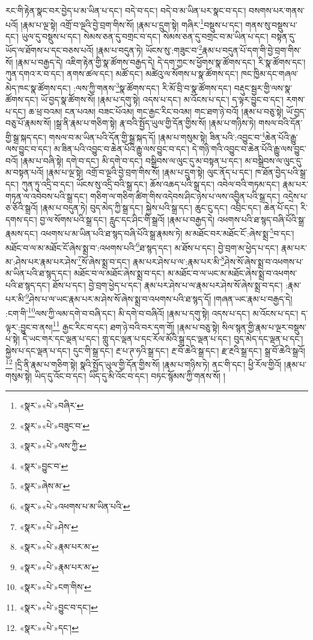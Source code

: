 རང་གི་རྟེན་སྣང་བར་བྱེད་པ་མ་ཡིན་པ་དང་། བདེ་བ་དང་། བདེ་བ་མ་ཡིན་པར་སྣང་བ་དང་། བསགས་པར་གནས་པའོ། །རྣམ་པ་ལྔ་སྟེ། འགྲོ་བ་ལྔའི་བྱེ་བྲག་གིས་སོ། །རྣམ་པ་དྲུག་སྟེ། གཞིར་\footnote{«སྣར་»«པེ་»བཞིར་}བསྡུས་པ་དང་། གནས་སུ་བསྡུས་པ་དང་། ཡུལ་དུ་བསྡུས་པ་དང་། སེམས་ཅན་དུ་བགྲང་བ་དང་། སེམས་ཅན་དུ་བགྲང་བ་མ་ཡིན་པ་དང་། བསྟན་དུ་ཡོད་ལ་ཐོགས་པ་དང་བཅས་པའོ། །རྣམ་པ་བདུན་ཏེ། ཡོངས་སུ་:གཟུང་བ་\footnote{«སྣར་»«པེ་»བཟུང་བ་}རྣམ་པ་བདུན་པོ་དག་གི་བྱེ་བྲག་གིས་སོ། །རྣམ་པ་བརྒྱད་དེ། འཇིག་རྟེན་གྱི་སྣ་ཚོགས་བརྒྱད་དེ། དེ་དག་ཀྱང་ས་ཕྱོགས་སྣ་ཚོགས་དང་། རི་སྣ་ཚོགས་དང་། ཀུན་དགའ་ར་བ་དང་། ནགས་ཚལ་དང་། མཚོ་དང་། མཚེའུ་ལ་སོགས་པ་སྣ་ཚོགས་དང་། ཁང་ཁྱིམ་དང་གཞལ་མེད་ཁང་སྣ་ཚོགས་དང་། :ལས་ཀྱི་གནས་\footnote{«སྣར་»«པེ་»ལས་ཀྱི་}སྣ་ཚོགས་དང་། རི་མོ་བྲི་བ་སྣ་ཚོགས་དང་། བརྡུང་སྦྱར་གྱི་ལས་སྣ་ཚོགས་དང་། ཡོ་བྱད་སྣ་ཚོགས་སོ། །རྣམ་པ་དགུ་སྟེ། འདས་པ་དང་། མ་འོངས་པ་དང་། ད་ལྟར་བྱུང་བ་དང་། རགས་པ་དང་། ཆ་ཕྲ་བའམ། ངན་པའམ། བཟང་པོའམ། གང་རྒྱང་རིང་བའམ། གང་ཐག་ཉེ་བའོ། །རྣམ་པ་བཅུ་སྟེ། ཡོ་བྱད་བཅུ་པོ་རྣམས་སོ། །སྒྲ་ནི་རྣམ་པ་གཅིག་སྟེ། རྣ་བའི་སྤྱོད་ཡུལ་གྱི་དོན་གྱིས་སོ། །རྣམ་པ་གཉིས་ཏེ། གསལ་བའི་དོན་གྱི་སྒྲ་སྐད་དང་། གསལ་བ་མ་ཡིན་པའི་དོན་གྱི་སྒྲ་སྐད་དོ། །རྣམ་པ་གསུམ་སྟེ། ཟིན་པའི་:འབྱུང་བ་\footnote{«སྣར་»བྱུང་བ་}ཆེན་པོའི་རྒྱུ་ལས་བྱུང་བ་དང་། མ་ཟིན་པའི་འབྱུང་བ་ཆེན་པོའི་རྒྱུ་ལས་བྱུང་བ་དང་། དེ་གཉི་གའི་འབྱུང་བ་ཆེན་པོའི་རྒྱུ་ལས་བྱུང་བའོ། །རྣམ་པ་བཞི་སྟེ། དགེ་བ་དང་། མི་དགེ་བ་དང་། བསྒྲིབས་ལ་ལུང་དུ་མ་བསྟན་པ་དང་། མ་བསྒྲིབས་ལ་ལུང་དུ་མ་བསྟན་པའོ། །རྣམ་པ་ལྔ་སྟེ། འགྲོ་བ་ལྔའི་བྱེ་བྲག་གིས་སོ། །རྣམ་པ་དྲུག་སྟེ། ལུང་ནོད་པ་དང་། ཁ་ཐོན་བྱེད་པའི་སྒྲ་དང་། ཀུན་ཏུ་འདྲི་བ་དང་། ཡོངས་སུ་འདྲི་བའི་སྒྲ་དང་། ཆོས་འཆད་པའི་སྒྲ་དང་། འབེལ་བའི་གཏམ་དང་། རྣམ་པར་གཏན་ལ་འབེབས་པའི་སྒྲ་དང་། གཅིག་ལ་གཅིག་ཚིག་གིས་འདེབས་ཤིང་ཉེས་པ་ལས་འབྱིན་པའི་སྒྲ་དང་། འདྲེས་པ་ཅ་ཅོའི་སྒྲའོ། །རྣམ་པ་བདུན་ཏེ། བུད་མེད་ཀྱི་སྒྲ་དང་། སྐྱེས་པའི་སྒྲ་དང་། ཆུང་ངུ་དང་། འབྲིང་དང་། ཆེན་པོ་དང་། རི་དགས་དང་། བྱ་ལ་སོགས་པའི་སྒྲ་དང་། རླུང་དང་ཤིང་གི་སྒྲའོ། །རྣམ་པ་བརྒྱད་དེ། འཕགས་པའི་ཐ་སྙད་བཞི་པོའི་སྒྲ་རྣམས་དང་། འཕགས་པ་མ་ཡིན་པའི་ཐ་སྙད་བཞི་པོའི་སྒྲ་རྣམས་ཏེ། མ་མཐོང་བར་མཐོང་ངོ་:ཞེས་སྨྲ་\footnote{«སྣར་»ཞེས་མ་}བ་དང་། མཐོང་བ་ལ་མ་མཐོང་ངོ་ཞེས་སྨྲ་བ་:འཕགས་པའི་\footnote{«སྣར་»«པེ་»འཕགས་པ་མ་ཡིན་པའི་}ཐ་སྙད་དང་། མ་ཐོས་པ་དང་། བྱེ་བྲག་མ་ཕྱེད་པ་དང་། རྣམ་པར་མ་:ཤེས་པར་རྣམ་པར་ཤེས་\footnote{«སྣར་»«པེ་»ཤེས་}སོ་ཞེས་སྨྲ་བ་དང་། རྣམ་པར་ཤེས་པ་ལ་:རྣམ་པར་མི་\footnote{«སྣར་»«པེ་»རྣམ་པར་མ་}ཤེས་སོ་ཞེས་སྨྲ་བ་འཕགས་པ་མ་ཡིན་པའི་ཐ་སྙད་དང་། མཐོང་བ་ལ་མཐོང་ཞེས་སྨྲ་བ་དང་། མ་མཐོང་བ་ལ་ཡང་མ་མཐོང་ཞེས་སྨྲ་བ་འཕགས་པའི་ཐ་སྙད་དང་། ཐོས་པ་དང་། བྱེ་བྲག་ཕྱེད་པ་དང་། རྣམ་པར་ཤེས་པ་ལ་རྣམ་པར་ཤེས་སོ་ཞེས་སྨྲ་བ་དང་། :རྣམ་པར་མི་\footnote{«སྣར་»«པེ་»རྣམ་པར་མ་}ཤེས་པ་ལ་ཡང་རྣམ་པར་མ་ཤེས་སོ་ཞེས་སྨྲ་བ་འཕགས་པའི་ཐ་སྙད་དོ། །གཞན་ཡང་རྣམ་པ་བརྒྱད་དེ། :ངག་གི་\footnote{«སྣར་»«པེ་»ངག་གིས་}ལས་ཀྱི་ལམ་དགེ་བ་བཞི་དང་། མི་དགེ་བ་བཞིའོ། །རྣམ་པ་དགུ་སྟེ། འདས་པ་དང་། མ་འོངས་པ་དང་། ད་ལྟར་:བྱུང་བ་ནས།\footnote{«སྣར་»«པེ་»བྱུང་བ་དང་།} རྒྱང་རིང་བ་དང་། ཐག་ཉེ་བའི་བར་དག་གོ། །རྣམ་པ་བཅུ་སྟེ། སིལ་སྙན་གྱི་རྣམ་པ་ལྔར་བསྡུས་པ་སྟེ། དེ་ཡང་གར་དང་ལྡན་པ་དང་། གླུ་དང་ལྡན་པ་དང་རོལ་མོའི་སྒྲ་དང་ལྡན་པ་དང་། བུད་མེད་དང་ལྡན་པ་དང་། སྐྱེས་པ་དང་ལྡན་པ་དང་། དུང་གི་སྒྲ་དང་། རྔ་པ་ཊ་ཧའི་སྒྲ་དང་། རྔ་བོ་ཆེའི་སྒྲ་དང་། རྫ་རྔའི་སྒྲ་དང་། སྒྲ་བོ་ཆེའི་སྒྲའོ།\footnote{«སྣར་»«པེ་»དང་།} །དྲི་ནི་རྣམ་པ་གཅིག་སྟེ། སྣའི་སྤྱོད་ཡུལ་གྱི་དོན་གྱིས་སོ། །རྣམ་པ་གཉིས་ཏེ། ནང་གི་དང་། ཕྱི་རོལ་གྱིའོ། །རྣམ་པ་གསུམ་སྟེ། ཡིད་དུ་འོང་བ་དང་། ཡིད་དུ་མི་འོང་བ་དང་། བཏང་སྙོམས་ཀྱི་གནས་སོ། །
